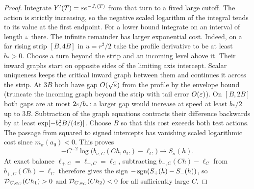 \begin{proof}
Integrate $Y'(T)=\varepsilon e^{-J_i(T)}$ from that turn to a fixed large
cutoff. The action is strictly increasing, so the negative scaled logarithm
of the integral tends to its value at the first endpoint. For a lower
bound integrate on an interval of length $\varepsilon$ there. The infinite
remainder has larger exponential cost. Indeed, on a far rising strip
$[B,4B]$ in $u=r^2/2$ take the profile derivative to be at least $b_*>0$.
Choose a turn beyond the strip and an incoming level above it. Their
inward graphs start on opposite sides of the limiting axis intercept.
Scalar uniqueness keeps the critical inward graph between them and
continues it across the strip.
At $3B$ both have gap $O(\sqrt{\varepsilon})$ from the profile by the envelope
bound (truncate the incoming graph beyond the strip with tail error
$O(\varepsilon)$). On $[B,2B]$ both gaps are at most $2\varepsilon/b_*$:
a larger gap would increase at speed at least $b_*/2$ up to $3B$.
Subtraction of the graph equations contracts their difference backwards
by at least $\exp[-b_*^2B/(4\varepsilon)]$. Choose $B$ so that this cost
exceeds both test actions. The passage from squared to signed intercepts
has vanishing scaled logarithmic cost since $m_\sigma(a_0)<0$. This proves
\begin{equation}\label{eq:seed-drop-rate}
 -C^{-2}\log\bigl(b_{\sigma,C}(Ch,a_C)-\ell_C\bigr)\longrightarrow S_\sigma(h).
\end{equation}
At exact balance $\ell_{+,C}=\ell_{-,C}=\ell_C$, subtracting $b_{-,C}(Ch)-\ell_C$ from
$b_{+,C}(Ch)-\ell_C$ therefore gives the sign $-\operatorname{sgn}(S_+(h)-S_-(h))$, so $\mathcal{D}_{C,a_C}(Ch_1)>0$ and
$\mathcal{D}_{C,a_C}(Ch_2)<0$ for all sufficiently large $C$.


\end{proof}
